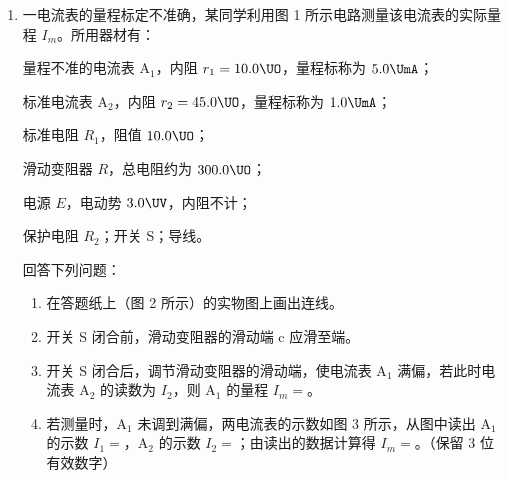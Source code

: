 \documentclass[\gkver]{gaokaozhenti}
\begin{document}
\begin{enumerate}
{\begin{enumerate}
	\item
	$1.46\Ucm$

\end{enumerate}
}

\item
一电流表的量程标定不准确，某同学利用图 1 所示电路测量该电流表的实际量程 $I_{m}$。所用器材有：

量程不准的电流表 A$_{1}$，内阻 $r_{1} = 10.0\UO$，量程标称为 $5.0\UmA$；

标准电流表 A$_{2}$，内阻 $r_{2} = 45.0\UO$，量程标称为 $1.0\UmA$；

标准电阻 $R_{1}$，阻值 $10.0\UO$；

滑动变阻器 $R$，总电阻约为 $300.0\UO$；

电源 $E$，电动势 $3.0\UV$，内阻不计；

保护电阻 $R_{2}$；开关 S；导线。

回答下列问题：

\begin{enumerate}
	\item
	在答题纸上（图 2 所示）的实物图上画出连线。


	\item
	开关 S 闭合前，滑动变阻器的滑动端 c 应滑至端。

	\item
	开关 S 闭合后，调节滑动变阻器的滑动端，使电流表 A$_{1}$ 满偏，若此时电流表 A$_{2}$ 的读数为 $I_{2}$，则 A$_{1}$ 的量程 $I_{m} =$。

	\item
	若测量时，A$_{1}$ 未调到满偏，两电流表的示数如图 3 所示，从图中读出 A$_{1}$ 的示数 $I_{1} =$\tkanswer{$3.00\UmA$}，A$_{2}$ 的示数 $I_{2} =$\tkanswer{$0.660\UmA$}；由读出的数据计算得 $I_{m} =$\tkanswer{$6.05\UmA$}。（保留 3 位有效数字）


\end{enumerate}
\end{enumerate}
\end{document}
